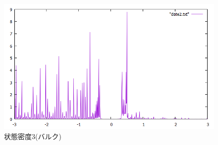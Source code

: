 \documentclass{jsarticle}
\begin{document}
            \begin{figure}[H]
                \centering
                \includegraphics[scale=0.5]{LDOS3b_bry.png}
                \caption{状態密度3(バルク)}
                \label{LDOS3b}
            \end{figure}

    
\end{document}
